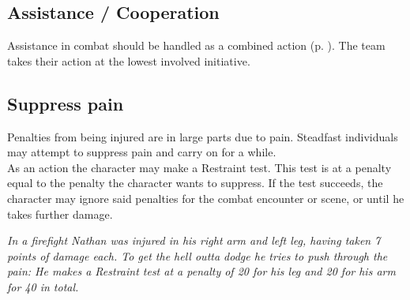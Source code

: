 \subsection*{Assistance / Cooperation}
Assistance in combat should be handled as a combined action (p. \pageref{combinedaction}).
The team takes their action at the lowest involved initiative.
\subsection*{Suppress pain}
Penalties from being injured are in large parts due to pain. Steadfast individuals may attempt to suppress pain and carry on for a while.\\
As an action the character may make a Restraint test. This test is at a penalty equal to the penalty the character wants to suppress.
If the test succeeds,
	the character may ignore said penalties for the combat encounter or scene,
	or until he takes further damage.
\begin{exampleblock}
	\itshape
	In a firefight Nathan was injured in his right arm and left leg, having taken 7 points of damage each. To get the hell outta dodge he tries to push through the pain: He makes a \emph{Restraint} test at a penalty of 20 for his leg and 20 for his arm for 40 in total.
\end{exampleblock}